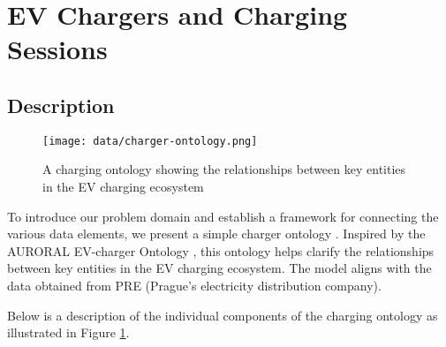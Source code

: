 \section{EV Chargers and Charging Sessions}

\subsection{Description}

\begin{figure}
    \texttt{[image: data/charger-ontology.png]}
    \caption{A charging ontology showing the relationships between key entities in the EV charging ecosystem}
    \label{fig:charging-ontology}
\end{figure}


To introduce our problem domain and establish a framework for connecting the various data elements, we present a simple charger ontology . Inspired by the AURORAL EV-charger Ontology , this ontology helps clarify the relationships between key entities in the EV charging ecosystem. The model aligns with the data obtained from PRE (Prague's electricity distribution company).

Below is a description of the individual components of the charging ontology as illustrated in Figure \ref{fig:charging-ontology}.

